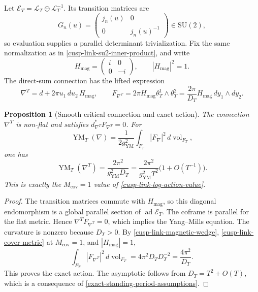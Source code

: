 \documentclass[11pt]{article}
\newtheorem{proposition}[theorem]{Proposition}
\theoremstyle{definition}
\numberwithin{equation}{section}
\begin{document}
Let \(\mathscr E_T=\mathscr L_T\oplus\mathscr L_T^{-1}\).  Its transition
matrices are
\[
 G_n(u)=\begin{pmatrix}j_n(u)&0\\0&j_n(u)^{-1}\end{pmatrix}
 \in\mathrm{SU}(2),
\]
so evaluation supplies a parallel determinant trivialization.  Fix the same
normalization as in \eqref{cusp-link-su2-inner-product}, and write
\begin{equation}
 H_{\mathrm{mag}}=\begin{pmatrix}i&0\\0&-i\end{pmatrix},
 \qquad |H_{\mathrm{mag}}|^2=1.
 \label{cusp-link-magnetic-generator}
\end{equation}
The direct-sum connection has the lifted expression
\begin{equation}
 \nabla^T=d+2\pi u_1\,du_2\,H_{\mathrm{mag}},
 \qquad
 F_{\nabla^T}
 =2\pi H_{\mathrm{mag}}\theta_T^1\wedge\theta_T^2
 =\frac{2\pi}{D_T}H_{\mathrm{mag}}\,dy_1\wedge dy_2.
 \label{cusp-link-magnetic-su2-connection}
\end{equation}

\begin{proposition}[Smooth critical connection and exact action]
\label{cusp-link-magnetic-critical-action}
The connection \(\nabla^T\) is non-flat and satisfies
\(d_{\nabla^T}^*F_{\nabla^T}=0\).  For
\begin{equation}
 \operatorname{YM}_T(\nabla)
 =\frac1{2g_{\mathrm{YM}}^2}
   \int_{F_T}|F_\nabla|^2\,d\operatorname{vol}_{F_T},
 \label{cusp-link-magnetic-ym-normalization}
\end{equation}
one has
\begin{equation}
 \operatorname{YM}_T(\nabla^T)
 =\frac{2\pi^2}{g_{\mathrm{YM}}^2D_T}
 =\frac{2\pi^2}{g_{\mathrm{YM}}^2T^2}
   \bigl(1+O(T^{-1})\bigr).
 \label{cusp-link-magnetic-action}
\end{equation}
This is exactly the \(M_{\mathrm{cov}}=1\) value of
\eqref{cusp-link-log-action-value}.
\end{proposition}

\begin{proof}
The transition matrices commute with \(H_{\mathrm{mag}}\), so this diagonal
endomorphism is a global parallel section of
\(\operatorname{ad}\mathscr E_T\).  The coframe is parallel for the flat
metric.  Hence \(\nabla^TF_{\nabla^T}=0\), which implies the Yang--Mills
equation.  The curvature is nonzero because \(D_T>0\).  By
\eqref{cusp-link-magnetic-wedge}, \eqref{cusp-link-cover-metric} at
\(M_{\mathrm{cov}}=1\), and \(|H_{\mathrm{mag}}|=1\),
\[
 \int_{F_T}|F_{\nabla^T}|^2\,d\operatorname{vol}_{F_T}
 =4\pi^2D_TD_T^{-2}=\frac{4\pi^2}{D_T}.
\]
This proves the exact action.  The asymptotic follows from
\(D_T=T^2+O(T)\), which is a consequence of
\eqref{exact-standing-period-assumptions}.
\end{proof}
\end{document}
